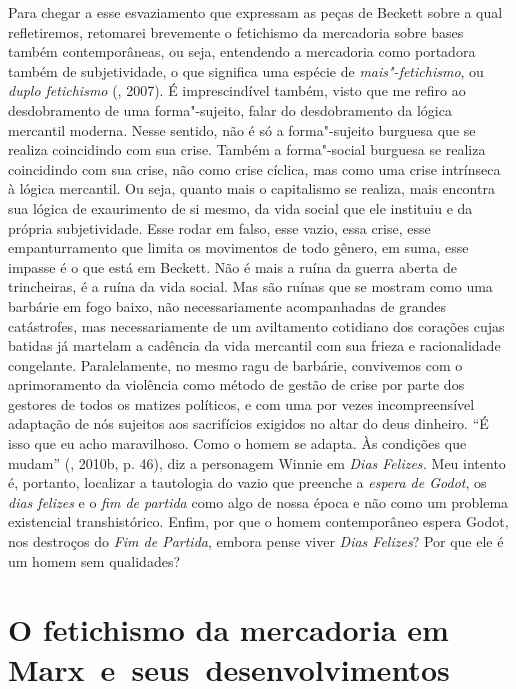 Para chegar a esse esvaziamento que expressam as peças de Beckett sobre
a qual refletiremos, retomarei brevemente o fetichismo da mercadoria sobre bases
também contemporâneas, ou seja, entendendo a mercadoria como portadora
também de subjetividade, o que significa uma espécie de
\emph{mais"-fetichismo}, ou \emph{duplo fetichismo} (,
2007). É imprescindível também, visto que me refiro ao
desdobramento de uma forma"-sujeito, falar do desdobramento da lógica
mercantil moderna. Nesse sentido, não é só a forma"-sujeito burguesa que
se realiza coincidindo com sua crise. Também a forma"-social burguesa se
realiza coincidindo com sua crise, não como crise cíclica, mas como uma
crise intrínseca à lógica mercantil. Ou seja, quanto mais o capitalismo
se realiza, mais encontra sua lógica de exaurimento de si mesmo, da vida
social que ele instituiu e da própria subjetividade. Esse rodar em
falso, esse vazio, essa crise, esse empanturramento que limita os
movimentos de todo gênero, em suma, esse impasse é o que está em
Beckett. Não é mais a ruína da guerra aberta de trincheiras, é a ruína da vida social.
Mas são ruínas que se mostram como uma barbárie em fogo baixo, não
necessariamente acompanhadas de grandes catástrofes, mas necessariamente
de um aviltamento cotidiano dos corações cujas batidas já martelam a
cadência da vida mercantil com sua frieza e racionalidade congelante.
Paralelamente, no mesmo ragu de barbárie, convivemos com o
aprimoramento da violência como método de gestão de crise por parte
dos gestores de todos os matizes políticos, e com uma por vezes
incompreensível adaptação de nós sujeitos aos sacrifícios exigidos no
altar do deus dinheiro. ``É isso que eu acho maravilhoso.
Como o homem se adapta. Às condições que mudam'' (, 2010b, p.
46), diz a personagem Winnie em \emph{Dias Felizes.} Meu intento é,
portanto, localizar a tautologia do vazio que preenche a \emph{espera de
Godot}, os \emph{dias felizes} e o \emph{fim de partida} como algo de
nossa época e não como um problema existencial transhistórico. Enfim,
por que o homem contemporâneo espera Godot, nos destroços do \emph{Fim
de Partida}, embora pense viver \emph{Dias Felizes}? Por que ele é um
homem sem qualidades?

\section*{O fetichismo da mercadoria em Marx~e~seus~desenvolvimentos}

